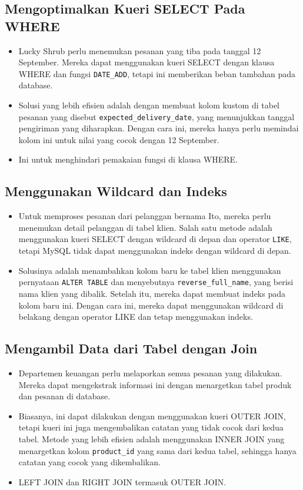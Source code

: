 \documentclass{article}
\begin{document}
\subsection{Mengoptimalkan Kueri SELECT Pada WHERE}
\begin{itemize}
    \item Lucky Shrub perlu menemukan pesanan yang tiba pada tanggal 12 September. Mereka dapat menggunakan kueri SELECT dengan klausa WHERE dan fungsi \verb|DATE_ADD|, tetapi ini memberikan beban tambahan pada database.
    \item Solusi yang lebih efisien adalah dengan membuat kolom kustom di tabel pesanan yang disebut \verb|expected_delivery_date|, yang menunjukkan tanggal pengiriman yang diharapkan. Dengan cara ini, mereka hanya perlu memindai kolom ini untuk nilai yang cocok dengan 12 September.
    \item Ini untuk menghindari pemakaian fungsi di klausa WHERE.
\end{itemize}

\subsection{Menggunakan Wildcard dan Indeks}
\begin{itemize}
    \item Untuk memproses pesanan dari pelanggan bernama Ito, mereka perlu menemukan detail pelanggan di tabel klien. Salah satu metode adalah menggunakan kueri SELECT dengan wildcard di depan dan operator \verb|LIKE|, tetapi MySQL tidak dapat menggunakan indeks dengan wildcard di depan.
    \item Solusinya adalah menambahkan kolom baru ke tabel klien menggunakan pernyataan \verb|ALTER TABLE| dan menyebutnya \verb|reverse_full_name|, yang berisi nama klien yang dibalik. Setelah itu, mereka dapat membuat indeks pada kolom baru ini. Dengan cara ini, mereka dapat menggunakan wildcard di belakang dengan operator LIKE dan tetap menggunakan indeks.
\end{itemize}

\subsection{Mengambil Data dari Tabel dengan Join}
\begin{itemize}
    \item Departemen keuangan perlu melaporkan semua pesanan yang dilakukan. Mereka dapat mengekstrak informasi ini dengan menargetkan tabel produk dan pesanan di database.
    \item Biasanya, ini dapat dilakukan dengan menggunakan kueri OUTER JOIN, tetapi kueri ini juga mengembalikan catatan yang tidak cocok dari kedua tabel. Metode yang lebih efisien adalah menggunakan INNER JOIN yang menargetkan kolom \verb|product_id| yang sama dari kedua tabel, sehingga hanya catatan yang cocok yang dikembalikan.
    \item LEFT JOIN dan RIGHT JOIN termasuk OUTER JOIN.
\end{itemize}
\end{document}
